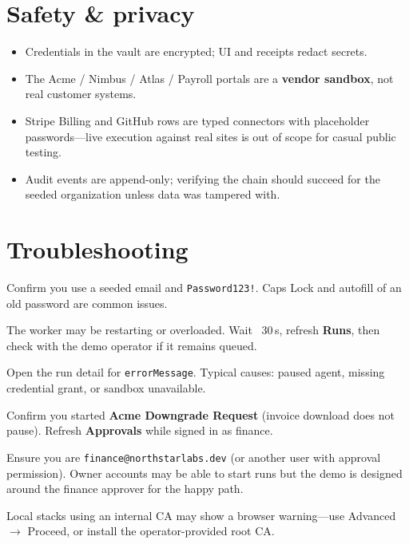 \documentclass[11pt,a4paper]{article}
\newcommand{\DemoPassword}{Password123!}
\newcommand{\ui}[1]{\textbf{#1}}
\newcommand{\email}[1]{\texttt{#1}}
\begin{document}
\section{Safety \& privacy}

\begin{itemize}[leftmargin=1.2em]
  \item Credentials in the vault are encrypted; UI and receipts redact secrets.
  \item The Acme / Nimbus / Atlas / Payroll portals are a \textbf{vendor sandbox},
        not real customer systems.
  \item Stripe Billing and GitHub rows are typed connectors with placeholder
        passwords---live execution against real sites is out of scope for casual
        public testing.
  \item Audit events are append-only; verifying the chain should succeed for the
        seeded organization unless data was tampered with.
\end{itemize}

\section{Troubleshooting}

\begin{description}[style=nextline,leftmargin=1.2em,font=\bfseries]
  \item[Cannot log in]
    Confirm you use a seeded email and \texttt{\DemoPassword}. Caps Lock and
    autofill of an old password are common issues.
  \item[Run stays queued]
    The worker may be restarting or overloaded. Wait ~30\,s, refresh \ui{Runs},
    then check with the demo operator if it remains queued.
  \item[Run fails immediately]
    Open the run detail for \texttt{errorMessage}. Typical causes: paused agent,
    missing credential grant, or sandbox unavailable.
  \item[No approval appears]
    Confirm you started \textbf{Acme Downgrade Request} (invoice download does
    not pause). Refresh \ui{Approvals} while signed in as finance.
  \item[Approve does nothing]
    Ensure you are \email{finance@northstarlabs.dev} (or another user with
    approval permission). Owner accounts may be able to start runs but the demo
    is designed around the finance approver for the happy path.
  \item[HTTPS / certificate warning (local demos only)]
    Local stacks using an internal CA may show a browser warning---use
    Advanced $\rightarrow$ Proceed, or install the operator-provided root CA.
\end{description}
\end{document}
